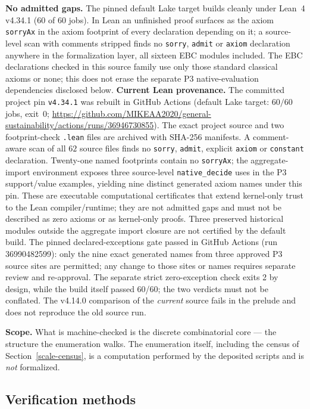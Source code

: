 \documentclass[10pt,twocolumn]{article}
\theoremstyle{plain}
\theoremstyle{definition}
\theoremstyle{remark}
\begin{document}
\noindent\textbf{No admitted gaps.} The pinned default Lake target builds cleanly under Lean~4 v4.34.1 (\(60\) of \(60\) jobs). In Lean an unfinished proof surfaces as the axiom
\texttt{sorryAx} in the axiom footprint of every declaration depending on it; a
source-level scan with comments stripped finds no \texttt{sorry}, \texttt{admit} or
\texttt{axiom} declaration anywhere in the formalization layer, all sixteen EBC modules
included. The EBC declarations checked in this source family use only those standard classical axioms or none; this does not erase the separate P3 native-evaluation dependencies disclosed below.
\noindent\textbf{Current Lean provenance.} The committed project pin \texttt{v4.34.1} was rebuilt in GitHub Actions (default Lake target: \(60/60\) jobs, exit~0; \url{https://github.com/MIKEAA2020/general-sustainability/actions/runs/36946730855}). The exact project source and two footprint-check \texttt{.lean} files are archived with SHA-256 manifests. A comment-aware scan of all \(62\) source files finds no \texttt{sorry}, \texttt{admit}, explicit \texttt{axiom} or \texttt{constant} declaration. Twenty-one named footprints contain no \texttt{sorryAx}; the aggregate-import environment exposes three source-level \texttt{native\_decide} uses in the P3 support/value examples, yielding nine distinct generated axiom names under this pin. These are executable computational certificates that extend kernel-only trust to the Lean compiler/runtime; they are not admitted gaps and must not be described as zero axioms or as kernel-only proofs. Three preserved historical modules outside the aggregate import closure are not certified by the default build. The pinned declared-exceptions gate passed in GitHub Actions (run 36990482599): only the nine exact generated names from three approved P3 source sites are permitted; any change to those sites or names requires separate review and re-approval. The separate strict zero-exception check exits 2 by design, while the build itself passed 60/60; the two verdicts must not be conflated. The v4.14.0 comparison of the \emph{current} source fails in the prelude and does not reproduce the old source run.


\noindent\textbf{Scope.} What is machine-checked is the discrete combinatorial core --- the
structure the enumeration walks. The enumeration itself, including the census of
Section~\ref{scale-census}, is a computation performed by the deposited scripts and is
\emph{not} formalized.

\subsection{Verification methods}\label{scale-methods}
\end{document}
